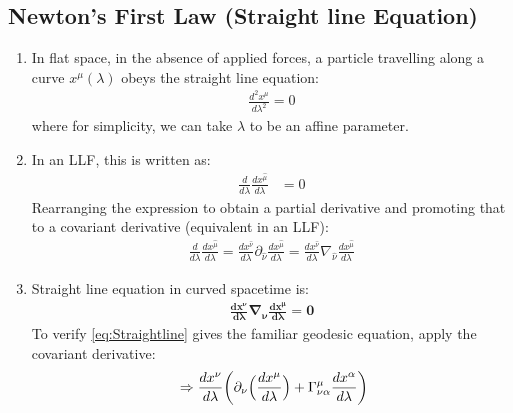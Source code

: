 \documentclass[10pt]{article}
\begin{document}
            \subsection{Newton's First Law (Straight line Equation)}
                \begin{enumerate}
                    \item In flat space, in the absence of applied forces, a particle travelling along a curve $x^{\mu}(\lambda)$ obeys the straight line equation:
                        \begin{align}
                            \frac{d^{2}x^{\mu}}{d\lambda^{2}} = 0
                        \end{align}
                    where for simplicity, we can take $\lambda$ to be an affine parameter.
                    \item In an LLF, this is written as:
                        \begin{align}
                            \frac{d}{d \lambda} \frac{dx^{\hat{\mu}}}{d\lambda} &= 0
                        \end{align}
                    Rearranging the expression to obtain a partial derivative and promoting that to a covariant derivative (equivalent in an LLF):
                        \begin{align}
                            \frac{d}{d \lambda} \frac{dx^{\hat{\mu}}}{d\lambda} = 
                            \frac{d x^{\hat{\nu}}}{d \lambda} \partial_{\hat{\nu}}\frac{dx^{\hat{\mu}}}{d\lambda}
                            = \frac{d x^{\hat{\nu}}}{d \lambda} \nabla_{\hat{\nu}}\frac{dx^{\hat{\mu}}}{d\lambda}
                        \end{align}
                    \item Straight line equation in curved spacetime is:
                        \begin{align}\label{eq:Straightline}
                            \boldsymbol{\frac{d x^{\nu}}{d \lambda} \nabla_{\nu} \frac{d x^{\mu}}{d \lambda} = 0}
                        \end{align}
                    To verify \eqref{eq:Straightline} gives the familiar geodesic equation, apply the covariant derivative:
                        \begin{align}
                            &\Rightarrow \frac{d x^{\nu}}{d \lambda} \bigg( \partial_{\nu}\Big( \frac{d x^{\mu}}{d \lambda}\Big) + \Gamma^{\mu}_{\nu \alpha}\frac{d x^{\alpha}}{d \lambda}\bigg) \notag \\

\end{align}
\end{enumerate}
\end{document}
